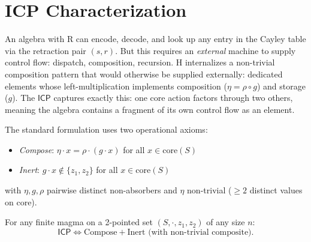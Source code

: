 \documentclass[sigconf,screen]{acmart}
\newcommand{\dotop}{\cdot}
\newcommand{\ICP}{\textsf{ICP}}
\newcommand{\core}{\mathrm{core}}
\theoremstyle{remark}
\begin{document}
\section{ICP Characterization}
\label{sec:icp}

An algebra with R can encode, decode, and look up any entry in the Cayley table via the retraction pair $(s, r)$. But this requires an \emph{external} machine to supply control flow: dispatch, composition, recursion. H internalizes a non-trivial composition pattern that would otherwise be supplied externally: dedicated elements whose left-multiplication implements composition ($\eta = \rho \circ g$) and storage ($g$). The $\ICP$ captures exactly this: one core action factors through two others, meaning the algebra contains a fragment of its own control flow as an element.

The standard formulation uses two operational axioms:
\begin{itemize}
  \item \emph{Compose}: $\eta \dotop x = \rho \dotop (g \dotop x)$ for all $x \in \core(S)$
  \item \emph{Inert}: $g \dotop x \notin \{z_1, z_2\}$ for all $x \in \core(S)$
\end{itemize}
with $\eta, g, \rho$ pairwise distinct non-absorbers and $\eta$ non-trivial ($\geq 2$ distinct values on core).

\begin{theorem}[$\ICP$ Equivalence]
\label{thm:icp-equiv}
For any finite magma on a 2-pointed set $(S, \dotop, z_1, z_2)$ of any size $n$:
\[
\ICP \iff \text{Compose} + \text{Inert} \text{ (with non-trivial composite)}.
\]
\end{theorem}
\end{document}
